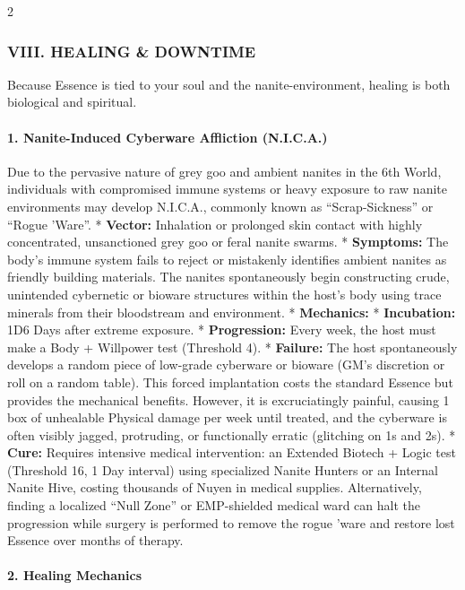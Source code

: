 \documentclass[
  oneside]{article}
\begin{document}
\begin{multicols}{2}

\hypertarget{viii.-healing-downtime}{%
\subsubsection{VIII. HEALING \&
DOWNTIME}\label{viii.-healing-downtime}}

Because Essence is tied to your soul and the
nanite-environment, healing is both biological and
spiritual.

\hypertarget{nanite-induced-cyberware-affliction-n.i.c.a.}{%
\paragraph{1. Nanite-Induced Cyberware Affliction
(N.I.C.A.)}\label{nanite-induced-cyberware-affliction-n.i.c.a.}}

Due to the pervasive nature of grey goo and
ambient nanites in the 6th World, individuals with
compromised immune systems or heavy exposure to
raw nanite environments may develop N.I.C.A.,
commonly known as ``Scrap-Sickness'' or ``Rogue
'Ware''. * \textbf{Vector:} Inhalation or
prolonged skin contact with highly concentrated,
unsanctioned grey goo or feral nanite swarms. *
\textbf{Symptoms:} The body's immune system fails
to reject or mistakenly identifies ambient nanites
as friendly building materials. The nanites
spontaneously begin constructing crude, unintended
cybernetic or bioware structures within the host's
body using trace minerals from their bloodstream
and environment. * \textbf{Mechanics:} *
\textbf{Incubation:} 1D6 Days after extreme
exposure. * \textbf{Progression:} Every week, the
host must make a Body + Willpower test (Threshold
4). * \textbf{Failure:} The host spontaneously
develops a random piece of low-grade cyberware or
bioware (GM's discretion or roll on a random
table). This forced implantation costs the
standard Essence but provides the mechanical
benefits. However, it is excruciatingly painful,
causing 1 box of unhealable Physical damage per
week until treated, and the cyberware is often
visibly jagged, protruding, or functionally
erratic (glitching on 1s and 2s). * \textbf{Cure:}
Requires intensive medical intervention: an
Extended Biotech + Logic test (Threshold 16, 1 Day
interval) using specialized Nanite Hunters or an
Internal Nanite Hive, costing thousands of Nuyen
in medical supplies. Alternatively, finding a
localized ``Null Zone'' or EMP-shielded medical
ward can halt the progression while surgery is
performed to remove the rogue 'ware and restore
lost Essence over months of therapy.

\hypertarget{healing-mechanics}{%
\paragraph{2. Healing
Mechanics}\label{healing-mechanics}}

\end{multicols}
\end{document}
